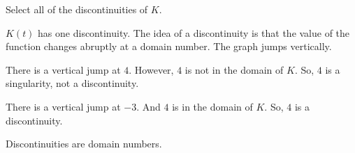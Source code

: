 \documentclass{ximera}
\begin{document}
\begin{example}
Select all of the discontinuities of $K$.
\begin{selectAll}
\end{selectAll}





$K(t)$ has one discontinuity.  The idea of a discontinuity is that the value of the function changes abruptly at a domain number.  The graph jumps vertically.  

There is a vertical jump at $4$. However, $4$ is not in the domain of $K$.  So, $4$ is a singularity, not a discontinuity.  


There is a vertical jump at $-3$. And $4$ is  in the domain of $K$.  So, $4$ is a discontinuity.  

\end{example}


Discontinuities are domain numbers. 
\end{document}
